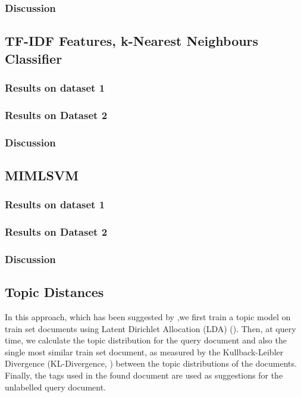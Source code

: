 \subsubsection{Discussion}




\subsection{TF-IDF Features, k-Nearest Neighbours Classifier}

\subsubsection{Results on dataset 1}

\subsubsection{Results on Dataset 2}

\subsubsection{Discussion}


\subsection{MIMLSVM}

\subsubsection{Results on dataset 1}

\subsubsection{Results on Dataset 2}

\subsubsection{Discussion}



\subsection{Topic Distances}

In this approach, which has been suggested by \cite{choubey_2011},we first train a topic model on train set documents using Latent Dirichlet Allocation (LDA) (\cite{blei_2013}). Then, at query time, we calculate the topic distribution for the query document and also the single most similar train set document, as measured by the Kullback-Leibler Divergence (KL-Divergence, \cite{kullback_leibler_1951}) between the topic distributions of the documents. Finally, the tags used in the found document are used as suggestions for the unlabelled query document.

